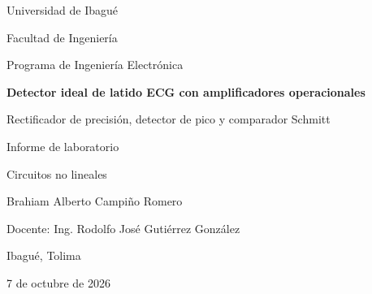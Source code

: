 \documentclass[11pt,letterpaper]{article}
\newcommand{\Vr}{V_r}
\newcommand{\Venv}{V_{env}}
\newcommand{\VTH}{V_{TH}}
\newcommand{\VTL}{V_{TL}}
\begin{document}
\begin{titlepage}
\centering
{\large Universidad de Ibagué\par}
{\large Facultad de Ingeniería\par}
{\large Programa de Ingeniería Electrónica\par}
\vspace{2.5cm}
{\LARGE\bfseries Detector ideal de latido ECG con amplificadores operacionales\par}
\vspace{0.6cm}
{\Large Rectificador de precisión, detector de pico y comparador Schmitt\par}
\vspace{2.5cm}
{\large Informe de laboratorio\par}
{\large Circuitos no lineales\par}
\vspace{2.5cm}
{\large Brahiam Alberto Campiño Romero\par}
\vspace{0.4cm}
{\large Docente: Ing. Rodolfo José Gutiérrez González\par}
\vfill
{\large Ibagué, Tolima\par}
{\large 7 de octubre de 2026\par}
\end{titlepage}

\begin{abstract}
Se diseñó, simuló y montó un detector de latido cardiaco que entrega un pulso rectangular limpio por cada complejo QRS de una señal tipo ECG. El circuito usa seis amplificadores operacionales alimentados a $\pm\SI{12}{V}$ y está formado por cinco etapas: un amplificador no inversor de ganancia 4,9, un rectificador de precisión de onda completa, un detector de pico con buffer y constante de descarga $\tau=\SI{100}{ms}$, un comparador Schmitt con umbrales $\VTH=\SI{1,01}{V}$ y $\VTL=\SI{0,52}{V}$, y un indicador LED. Cada etapa se dimensionó a partir de especificaciones de la señal (amplitud de 0,5 a \SI{2}{V_{pp}}, ancho de \SI{75}{ms}, frecuencia de 40 a 150 latidos por minuto) y se verificó con una simulación por comportamiento en Python y con Proteus. En la simulación el circuito detectó todos los latidos dentro del rango de diseño en ambas polaridades; el único caso que falla, 180 lpm con \SI{2}{V_{pp}}, coincide con el límite teórico de \SI{163}{lpm} que predice el análisis de la descarga. El montaje con dos LM324N se probó con la forma de onda cardiaca del generador Agilent 33120A a \SI{1,2}{Hz}: entregó un pulso por latido (\SI{1,199}{Hz} medidos a la salida), con picos de \SI{4,23}{V} en $\Vr$ y \SI{4,32}{V} en $\Venv$, y siguió detectando cada latido con una entrada de \SI{4}{V_{pp}}, el doble del máximo de diseño.

\medskip
\noindent\textbf{Palabras clave:} rectificador de precisión, detector de pico, comparador Schmitt, histéresis, ECG, amplificador operacional.
\end{abstract}
\end{document}
